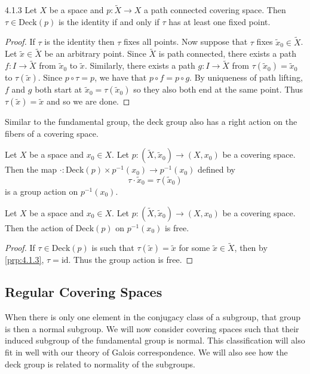 \documentclass[a4paper]{article}
\begin{document}
\begin{prp}{}{4.1.3} Let $X$ be a space and $p:\tilde{X}\to X$ a path connected covering space. Then $\tau\in\text{Deck}(p)$ is the identity if and only if $\tau$ has at least one fixed point. 
\begin{proof}
If $\tau$ is the identity then $\tau$ fixes all points. Now suppose that $\tau$ fixes $\tilde{x}_0\in\tilde{X}$. Let $\tilde{x}\in\tilde{X}$ be an arbitrary point. Since $\tilde{X}$ is path connected, there exists a path $f:I\to\tilde{X}$ from $\tilde{x}_0$ to $\tilde{x}$. Similarly, there exists a path $g:I\to\tilde{X}$ from $\tau(\tilde{x}_0)=\tilde{x}_0$ to $\tau(\tilde{x})$. Since $p\circ\tau=p$, we have that $p\circ f=p\circ g$. By uniqueness of path lifting, $f$ and $g$ both start at $\tilde{x}_0=\tau(\tilde{x}_0)$ so they also both end at the same point. Thus $\tau(\tilde{x})=\tilde{x}$ and so we are done. 
\end{proof}
\end{prp}

Similar to the fundamental group, the deck group also has a right action on the fibers of a covering space. 

\begin{prp}{}{} Let $X$ be a space and $x_0\in X$. Let $p:(\tilde{X},\tilde{x}_0)\to(X,x_0)$ be a covering space. Then the map $\cdot:\text{Deck}(p)\times p^{-1}(x_0)\to p^{-1}(x_0)$ defined by $$\tau\cdot\tilde{x}_0=\tau(\tilde{x}_0)$$ is a group action on $p^{-1}(x_0)$. 
\end{prp}

\begin{prp}{}{} Let $X$ be a space and $x_0\in X$. Let $p:(\tilde{X},\tilde{x}_0)\to(X,x_0)$ be a covering space. Then the action of $\text{Deck}(p)$ on $p^{-1}(x_0)$ is free. 
\begin{proof}
If $\tau\in\text{Deck}(p)$ is such that $\tau(\tilde{x})=\tilde{x}$ for some $\tilde{x}\in\tilde{X}$, then by \ref{prp:4.1.3}, $\tau=\text{id}$. Thus the group action is free. 
\end{proof}
\end{prp}

\subsection{Regular Covering Spaces}
When there is only one element in the conjugacy class of a subgroup, that group is then a normal subgroup. We will now consider covering spaces such that their induced subgroup of the fundamental group is normal. This classification will also fit in well with our theory of Galois correspondence. We will also see how the deck group is related to normality of the subgroups. 
\end{document}
